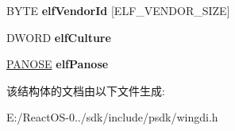 \begin{DoxyCompactItemize}
B\+Y\+TE {\bfseries elf\+Vendor\+Id} \mbox{[}E\+L\+F\+\_\+\+V\+E\+N\+D\+O\+R\+\_\+\+S\+I\+ZE\mbox{]}
\item 
\mbox{\label{structtag_e_x_t_l_o_g_f_o_n_t_a_a84bbdf183b26752f29c72f04c322e8c4}} 
D\+W\+O\+RD {\bfseries elf\+Culture}
\item 
\mbox{\label{structtag_e_x_t_l_o_g_f_o_n_t_a_a5a8b4262f79252e7a259d67192ff1288}} 
\hyperlink{structtag_p_a_n_o_s_e}{P\+A\+N\+O\+SE} {\bfseries elf\+Panose}
\end{DoxyCompactItemize}


该结构体的文档由以下文件生成\+:\begin{DoxyCompactItemize}
\item 
E\+:/\+React\+O\+S-\/0../sdk/include/psdk/wingdi.\+h\end{DoxyCompactItemize}
